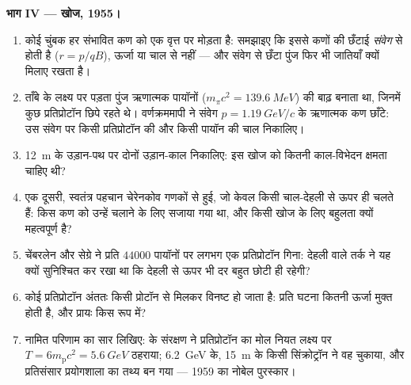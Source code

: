 \begin{problem}[{सप्ताहांत समस्या --- संवेग-संरक्षण ने प्रतिसंसार का
मोल कैसे तय किया}]
\medskip\noindent\textbf{भाग IV --- खोज, 1955।}
\begin{enumerate}[resume]
  \item कोई चुंबक हर संभावित कण को एक वृत्त पर मोड़ता है: समझाइए कि
        इससे कणों की छँटाई \emph{संवेग} से होती है ($r = p/qB$),
        ऊर्जा या चाल से नहीं --- और संवेग से छँटा पुंज फिर भी
        जातियाँ क्यों मिलाए रखता है।
  \item ताँबे के लक्ष्य पर पड़ता पुंज ऋणात्मक पायॉनों
        ($m_\pi c^2 = \qty{139.6}{MeV}$) की बाढ़ बनाता था, जिनमें
        कुछ प्रतिप्रोटॉन छिपे रहते थे। वर्णक्रममापी ने संवेग
        $p = \qty{1.19}{GeV}/c$ के ऋणात्मक कण छाँटे: उस संवेग पर किसी
        प्रतिप्रोटॉन की और किसी पायॉन की चाल निकालिए।
  \item \qty{12}{m} के उड़ान-पथ पर दोनों उड़ान-काल निकालिए: इस खोज को
        कितनी काल-विभेदन क्षमता चाहिए थी?
  \item एक दूसरी, स्वतंत्र पहचान चेरेनकोव गणकों से हुई, जो केवल किसी
        चाल-देहली से ऊपर ही चलते हैं: किस कण को उन्हें चलाने के लिए
        सजाया गया था, और किसी खोज के लिए बहुलता क्यों महत्वपूर्ण है?
  \item चेंबरलेन और सेग्रे ने प्रति $\num{44000}$ पायॉनों पर लगभग
        एक प्रतिप्रोटॉन गिना: देहली वाले तर्क ने यह क्यों सुनिश्चित
        कर रखा था कि देहली से ऊपर भी दर बहुत छोटी ही रहेगी?
  \item कोई प्रतिप्रोटॉन अंततः किसी प्रोटॉन से मिलकर विनष्ट हो जाता
        है: प्रति घटना कितनी ऊर्जा मुक्त होती है, और प्रायः किस रूप में?
  \item नामित परिणाम का सार लिखिए:  के संरक्षण ने
        प्रतिप्रोटॉन का मोल नियत लक्ष्य पर $T = 6m_{\text{p}}c^2 =
        \qty{5.6}{GeV}$ ठहराया; \qty{6.2}{GeV} के, \qty{15}{m} के
        किसी सिंक्रोट्रॉन ने वह चुकाया, और प्रतिसंसार प्रयोगशाला का
        तथ्य बन गया --- 1959 का नोबेल पुरस्कार।
\end{enumerate}
\end{problem}
